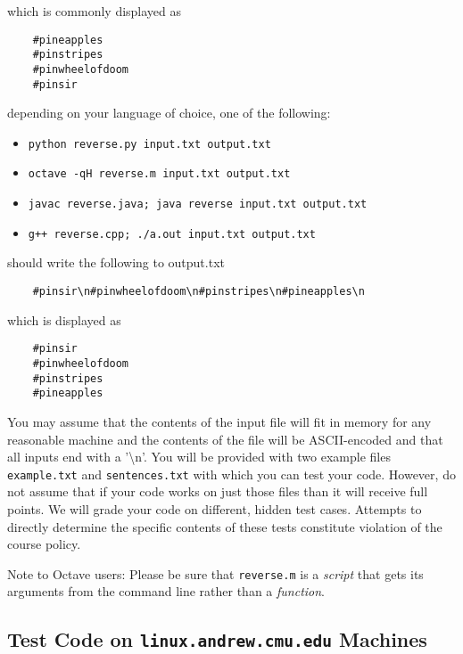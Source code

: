 \documentclass[12pt]{article}
\begin{document}
which is commonly displayed as
\begin{verbatim}
    #pineapples
    #pinstripes
    #pinwheelofdoom
    #pinsir
\end{verbatim}

depending on your language of choice, one of the following:

\begin{itemize}
    \item \texttt{python reverse.py input.txt output.txt}
    \item \texttt{octave -qH reverse.m input.txt output.txt}
    \item \texttt{javac reverse.java; java reverse input.txt output.txt}
    \item \texttt{g++ reverse.cpp; ./a.out input.txt output.txt}
\end{itemize}

should write the following to output.txt

\begin{verbatim}
    #pinsir\n#pinwheelofdoom\n#pinstripes\n#pineapples\n
\end{verbatim}

which is displayed as

\begin{verbatim}
    #pinsir
    #pinwheelofdoom
    #pinstripes
    #pineapples
\end{verbatim}

You may assume that the contents of the input file will fit in memory for any reasonable machine and the contents of the file will be ASCII-encoded and that all inputs end with a '\textbackslash n'. You will be provided with two example files \texttt{example.txt} and \texttt{sentences.txt} with which you can test your code. However, do not assume that if your code works on just those files than it will receive full points. We will grade your code on different, hidden test cases. Attempts to directly determine the specific contents of these tests constitute violation of the course policy.

{\color{red} 
Note to Octave users: Please be sure that \texttt{reverse.m} is a \textit{script} that gets its arguments from the command line rather than a \textit{function}.}

\subsection{Test Code on \texttt{linux.andrew.cmu.edu} Machines}
\end{document}

